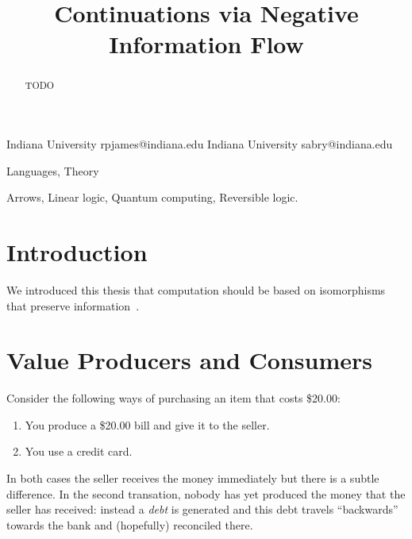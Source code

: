 \documentclass[preprint]{sigplanconf}
\begin{document}
\CopyrightYear{}
\copyrightdata{}
\titlebanner{}
\preprintfooter{}

\title{Continuations via Negative Information Flow}
           {Indiana University}
           {rpjames@indiana.edu}
           {Indiana University}
           {sabry@indiana.edu}
\maketitle

\begin{abstract}
TODO
\end{abstract}


\terms
Languages, Theory

\keywords Arrows, Linear logic, Quantum computing, Reversible logic.

\section{Introduction}

We introduced this thesis that computation should be based on isomorphisms
that preserve information~\cite{infeffects}.

\section{Value Producers and Consumers}

Consider the following ways of purchasing an item that costs \$20.00:

\begin{enumerate}
\item You produce a \$20.00 bill and give it to the seller.
\item You use a credit card. 
\end{enumerate}
In both cases the seller receives the money immediately but there is a subtle
difference. In the second transation, nobody has yet produced the money that
the seller has received: instead a \emph{debt} is generated and this debt
travels ``backwards'' towards the bank and (hopefully) reconciled there.
\end{document}
